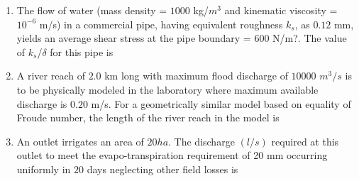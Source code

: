 \documentclass[journal]{IEEEtran}
\begin{document}
\begin{enumerate}
\begin{enumerate}
\end{enumerate}

\item The flow of water (mass density = $1000$ kg/$m^{3}$ and kinematic viscosity = $10^{-6}$ m/s) in a commercial pipe, having equivalent roughness $k_s$, as $0.12$ mm, yields an average shear stress at the pipe boundary = $600$ N/m?. The value of $k_s$/$\delta$  for this pipe is \hfill {}

\begin{enumerate}
\end{enumerate}

\item A river reach of $2.0$ km long with maximum flood discharge of $10000$ $m^{3}/s$ is to be physically modeled in the laboratory where maximum available discharge is $0.20$ m/s. For a geometrically similar model based on equality of Froude number, the length of the river reach  in the model is \hfill {}

\begin{enumerate}
\end{enumerate}

\item An outlet irrigates an area of $20  ha$. The discharge $(l/s)$ required at this outlet to meet the evapo-transpiration requirement of 20 mm occurring uniformly in $20$ days neglecting other field losses is \hfill {}


\end{enumerate}
\end{document}
